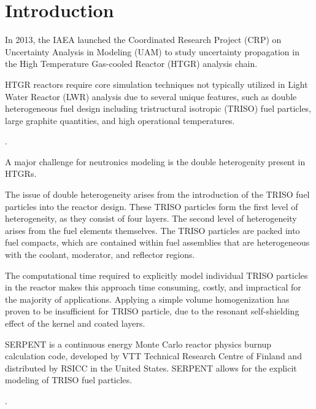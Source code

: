 \documentclass[11pt,letterpaper]{article}
\begin{document}

\section{Introduction}

In 2013, the IAEA launched the Coordinated Research Project (CRP) on Uncertainty Analysis in Modeling (UAM) to study uncertainty propagation in the High Temperature Gas-cooled Reactor (HTGR) analysis chain.

HTGR reactors require core simulation techniques not typically utilized in Light Water Reactor (LWR) analysis due to several unique features, such as double heterogeneous fuel design including tristructural isotropic (TRISO) fuel particles, large graphite quantities, and high operational temperatures.

\cite{bostelmann_criticality_2016}.

A major challenge for neutronics modeling is the double heterogenity present in \glspl{HTGR}.

The issue of double heterogeneity arises from the introduction of the TRISO fuel particles into the reactor design.
These TRISO particles form the first level of heterogeneity, as they consist of four layers.
The second level of heterogeneity arises from the fuel elements themselves.
The TRISO particles are packed into fuel compacts, which are contained within fuel assemblies that are heterogeneous with the coolant, moderator, and reflector regions.

The computational time required to explicitly model individual TRISO particles in the reactor makes this approach time consuming, costly, and impractical for the majority of applications.
Applying a simple volume homogenization has proven to be insufficient for TRISO particle, due to the resonant self-shielding effect of the kernel and coated layers.

SERPENT is a continuous energy Monte Carlo reactor physics burnup calculation code, developed by VTT Technical Research Centre of Finland and distributed by RSICC in the United States.
SERPENT allows for the explicit modeling of TRISO fuel particles.

\cite{rahnema_whitepaper_2015}.
\end{document}
